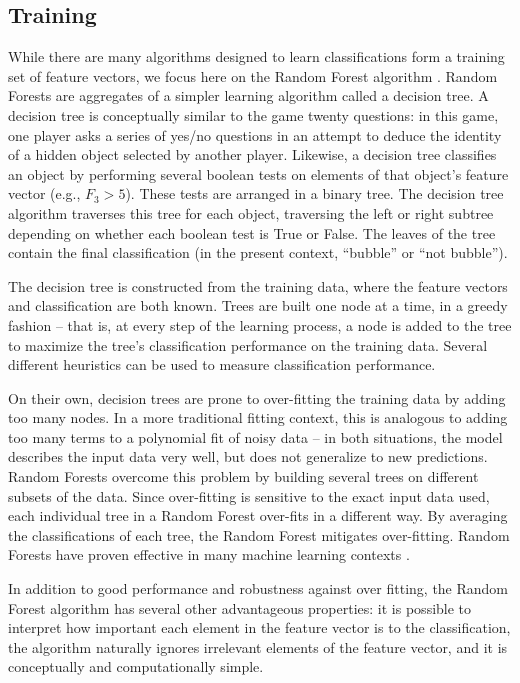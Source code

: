\subsection{Training}
While there are many algorithms designed to learn classifications form a training set of feature vectors, we focus here on the Random Forest algorithm \citep{Breiman01}. Random Forests are aggregates of a simpler learning algorithm called a decision tree. A decision tree is conceptually similar to the game twenty questions: in this game, one player asks a series of yes/no questions in an attempt to deduce the identity of a hidden object selected by another player. Likewise, a decision tree classifies an object by performing several boolean tests on elements of that object's feature vector (e.g., $F_3 > 5$). These tests are arranged in a binary tree. The decision tree algorithm traverses this tree for each object, traversing the left or right subtree depending on whether each boolean test is True or False. The leaves of the tree contain the final classification (in the present context, ``bubble'' or ``not bubble'').

The decision tree is constructed from the training data, where the feature vectors and classification are both known. Trees are built one node at a time, in a greedy fashion -- that is, at every step of the learning process, a node is added to the tree to maximize the tree's classification performance on the training data. Several different heuristics can be used to measure classification performance.

On their own, decision trees are prone to over-fitting the training data by adding too many nodes. In a more traditional fitting context, this is analogous to adding too many terms to a polynomial fit of noisy data -- in both situations, the model describes the input data very well, but does not generalize to new predictions. Random Forests overcome this problem by building several trees on different subsets of the data. Since over-fitting is sensitive to the exact input data used, each individual tree in a Random Forest over-fits in a different way. By averaging the classifications of each tree, the Random Forest mitigates over-fitting. Random Forests have proven effective in many machine learning contexts \citep{Kuhn13}.

In addition to good performance and robustness against over fitting, the Random Forest algorithm has several other advantageous properties: it is possible to interpret how important each element in the feature vector is to the classification, the algorithm naturally ignores irrelevant elements of the feature vector, and it is conceptually and computationally simple.

